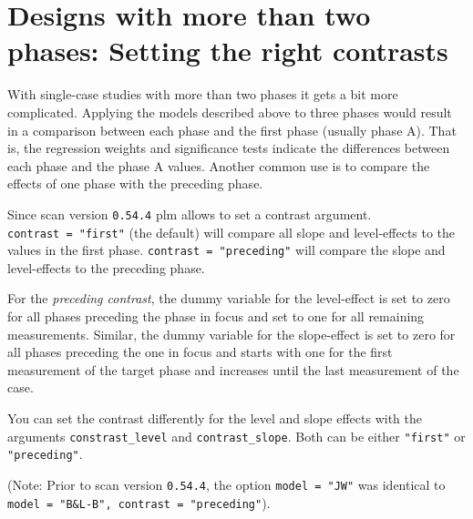 \documentclass[
  letterpaper,
  DIV=11,
  numbers=noendperiod]{scrreprt}
\begin{document}
\hypertarget{designs-with-more-than-two-phases-setting-the-right-contrasts}{%
\section{Designs with more than two phases: Setting the right
contrasts}\label{designs-with-more-than-two-phases-setting-the-right-contrasts}}

With single-case studies with more than two phases it gets a bit more
complicated. Applying the models described above to three phases would
result in a comparison between each phase and the first phase (usually
phase A). That is, the regression weights and significance tests
indicate the differences between each phase and the phase A values.
Another common use is to compare the effects of one phase with the
preceding phase.

Since scan version \texttt{0.54.4} plm allows to set a contrast
argument. \texttt{contrast\ =\ "first"} (the default) will compare all
slope and level-effects to the values in the first phase.
\texttt{contrast\ =\ "preceding"} will compare the slope and
level-effects to the preceding phase.

For the \emph{preceding contrast}, the dummy variable for the
level-effect is set to zero for all phases preceding the phase in focus
and set to one for all remaining measurements. Similar, the dummy
variable for the slope-effect is set to zero for all phases preceding
the one in focus and starts with one for the first measurement of the
target phase and increases until the last measurement of the case.

You can set the contrast differently for the level and slope effects
with the arguments \texttt{constrast\_level} and
\texttt{contrast\_slope}. Both can be either \texttt{"first"} or
\texttt{"preceding"}.

(Note: Prior to scan version \texttt{0.54.4}, the option
\texttt{model\ =\ "JW"} was identical to
\texttt{model\ =\ "B\&L-B",\ contrast\ =\ "preceding"}).
\end{document}
